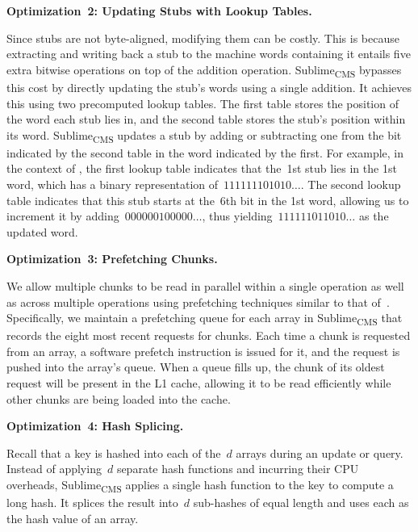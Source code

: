 \documentclass[sigconf]{acmart}
\newcommand{\sketch}{Sublime}
\newcommand{\sketchcms}{\sketch\textsubscript{CMS}\xspace}
\begin{document}
\hypertarget{optimization:lookup_tables}{\textbf{Optimization~2: Updating Stubs with Lookup Tables.}}
Since stubs are not byte-aligned, modifying them can be costly. This is because
extracting and writing back a stub to the machine words containing it entails
five extra bitwise operations on top of the addition operation. \sketchcms
bypasses this cost by directly updating the stub's words using a single
addition. It achieves this using two precomputed lookup tables. The first table
stores the position of the word each stub lies in, and the second table stores
the stub's position within its word. \sketchcms updates a stub by adding or
subtracting one from the bit indicated by the second table in the word
indicated by the first. For example, in the context of
, the first lookup table indicates that the~1st stub
lies in the 1st word, which has a binary representation of~$111111101010\dots$.
The second lookup table indicates that this stub starts at the~6th bit in the
1st word, allowing us to increment it by adding~$000000100000\dots$, thus
yielding~$111111011010\dots$ as the updated word.

\hypertarget{optimization:prefetching}{\textbf{Optimization~3: Prefetching Chunks.}}
We allow multiple chunks to be read in parallel within a single operation as
well as across multiple operations using prefetching techniques similar to that
of~\cite{StingySketch}. Specifically, we maintain a prefetching queue for each
array in \sketchcms that records the eight most recent requests for chunks.
Each time a chunk is requested from an array, a software prefetch instruction
is issued for it, and the request is pushed into the array's queue. When a
queue fills up, the chunk of its oldest request will be present in the L1
cache, allowing it to be read efficiently while other chunks are being loaded
into the cache. 

\hypertarget{optimization:hash_splicing}{\textbf{Optimization~4: Hash Splicing.}}
Recall that a key is hashed into each of the~$d$ arrays during an update or
query. Instead of applying~$d$ separate hash functions and incurring their CPU
overheads, \sketchcms applies a single hash function to the key to compute a
long hash. It splices the result into~$d$ sub-hashes of equal length and uses
each as the hash value of an array. 
\end{document}
